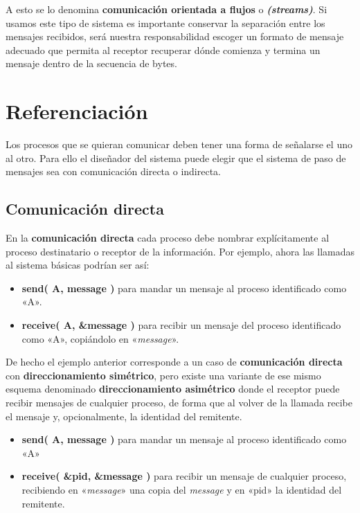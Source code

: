 A esto se lo denomina \textbf{comunicación orientada a flujos} o
\textbf{\emph{(streams)}}. Si usamos este tipo de sistema es importante
conservar la separación entre los mensajes recibidos, será nuestra
responsabilidad escoger un formato de mensaje adecuado que permita al
receptor recuperar dónde comienza y termina un mensaje dentro de la
secuencia de bytes.

\section{Referenciación}\label{_referenciaciuxf3n}

Los procesos que se quieran comunicar deben tener una forma de señalarse
el uno al otro. Para ello el diseñador del sistema puede elegir que el
sistema de paso de mensajes sea con comunicación directa o indirecta.

\subsection{Comunicación directa}\label{_comunicaciuxf3n_directa}

En la \textbf{comunicación directa}{} cada proceso debe nombrar
explícitamente al proceso destinatario o receptor de la información. Por
ejemplo, ahora las llamadas al sistema básicas podrían ser así:

\begin{itemize}
\item
  \textbf{send( A, message )} para mandar un mensaje al proceso
  identificado como «A».
\item
  \textbf{receive( A, \&message )} para recibir un mensaje del proceso
  identificado como «A», copiándolo en «\emph{message}».
\end{itemize}

De hecho el ejemplo anterior corresponde a un caso de
\textbf{comunicación directa} con \textbf{direccionamiento simétrico}{},
pero existe una variante de ese mismo esquema denominado
\textbf{direccionamiento asimétrico}{} donde el receptor puede recibir
mensajes de cualquier proceso, de forma que al volver de la llamada
recibe el mensaje y, opcionalmente, la identidad del remitente.

\begin{itemize}
\item
  \textbf{send( A, message )} para mandar un mensaje al proceso
  identificado como «A»
\item
  \textbf{receive( \&pid, \&message )} para recibir un mensaje de
  cualquier proceso, recibiendo en «\emph{message}» una copia del
  \emph{message} y en «pid» la identidad del remitente.
\end{itemize}

